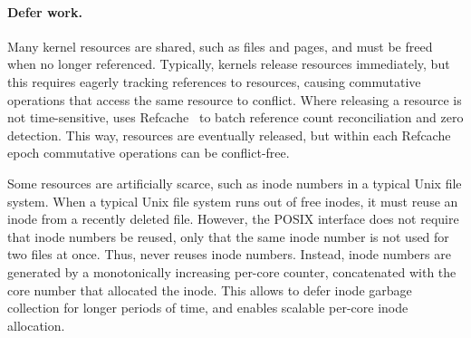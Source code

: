 

\paragraph{Defer work.} Many kernel resources are shared,
such as files and pages, and must be freed when no longer referenced.
Typically, kernels release resources immediately, but this requires
eagerly tracking references to resources, causing
commutative operations that access the same resource to conflict.  Where
releasing a resource is not time-sensitive, \fs
uses Refcache~\cite{clements:radixvm} to batch reference count
reconciliation and zero detection.  This way, resources are eventually
released, but within each Refcache epoch commutative operations can be
conflict-free.



Some resources are artificially scarce, such as inode numbers in a typical
Unix file system.  When a typical Unix file system runs out of free
inodes, it must reuse an inode from a recently deleted file.  However,
the POSIX interface does not require that inode numbers be reused, only
that the same inode number is not used for two files at once.  Thus,
\fs never reuses inode numbers.  Instead, inode numbers are
generated by a monotonically increasing per-core counter, concatenated
with the core number that allocated the inode.  This allows \fs to defer
inode garbage collection for longer periods of time, and enables scalable
per-core inode allocation.



